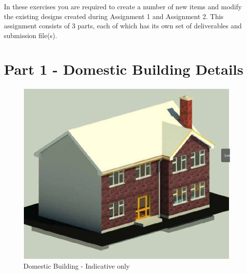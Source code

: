 \vspace{1cm}


In these exercises you are required to create a number of new items and modify the existing designs created during Assignment 1 and Assignment 2.  This assignment consists of 3 parts, each of which has its own set of deliverables and submission file(s).

\newpage
\section*{Part 1 - Domestic Building Details}



\begin{figure}
	\centering
	\includegraphics[width=1.0\linewidth]{./img/House}
	\caption{Domestic Building - Indicative only}
	\label{fig:house}
\end{figure}



